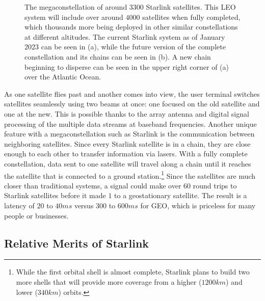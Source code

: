 \documentclass[10pt]{article}
\begin{document}
\begin{figure}[htp]
    \hspace*{\fill}%
    \hfill%
    \hspace*{\fill}%

    \bigskip
    
\caption{The megaconstellation of around $3300$ Starlink satellites. This LEO system will include over around $4000$ satellites when fully completed, which thousands more being deployed in other similar constellations at different altitudes. The current Starlink system as of January $2023$ can be seen in (a), while the future version of the complete constellation and its chains can be seen in (b). A new chain beginning to disperse can be seen in the upper right corner of (a) over the Atlantic Ocean\cite{Astria_Graph}\cite{full_constellation}.}

\label{fig:constellation}
\end{figure}

As one satellite flies past and another comes into view, the user terminal switches satellites seamlessly using two beams at once: one focused on the old satellite and one at the new. This is possible thanks to the array antenna and digital signal processing of the multiple data streams at baseband frequencies. Another unique feature with a megaconstellation such as Starlink is the communication between neighboring satellites. Since every Starlink satellite is in a chain, they are close enough to each other to transfer information via lasers. With a fully complete constellation, data sent to one satellite will travel along a chain until it reaches the satellite that is connected to a ground station.\footnote{While the first orbital shell is almost complete, Starlink plans to build two more shells that will provide more coverage from a higher ($1200\si{km}$) and lower ($340\si{km}$) orbits.} Since the satellites are much closer than traditional systems, a signal could make over $60$ round trips to Starlink satellites before it made $1$ to a geostationary satellite. The result is a latency of $20$ to $40\si{ms}$ versus $300$ to $600\si{ms}$ for GEO, which is priceless for many people or businesses.

\subsection{Relative Merits of Starlink}
\label{starlink_merits}
\end{document}
